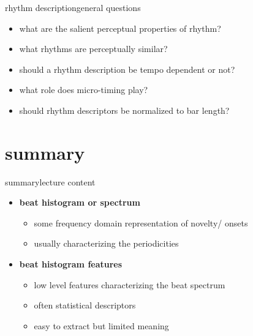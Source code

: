             \begin{frame}{rhythm description}{general questions}
                \begin{itemize}
                    \item   what are the salient perceptual properties of rhythm?
                    \smallskip
                    \item   what rhythms are perceptually similar?
                    \smallskip
                    \item   should a rhythm description be tempo dependent or not?
                    \smallskip
                    \item   what role does micro-timing play?
                    \smallskip
                    \item   should rhythm descriptors be normalized to bar length?
                \end{itemize}
            \end{frame}

    
    \section{summary}
        \begin{frame}{summary}{lecture content}
            \begin{itemize}
                \item   \textbf{beat histogram or spectrum}
                    \begin{itemize}
                        \item   some frequency domain representation of  novelty/ onsets
                        \item   usually characterizing the periodicities
                    \end{itemize}
                \bigskip
                \item   \textbf{beat histogram features}
                    \begin{itemize}
                        \item   low level features characterizing the beat spectrum
                        \item   often statistical descriptors
                        \item   easy to extract but limited meaning
                    \end{itemize}
            \end{itemize}
        \end{frame}

